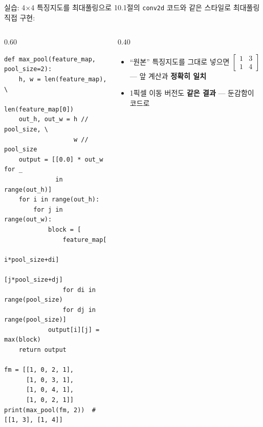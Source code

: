\begin{frame}[fragile,shrink=18]{실습: 4$\times$4 특징지도를 최대풀링으로}
  10.1절의 \texttt{conv2d} 코드와 같은 스타일로 최대풀링 직접 구현:
  \begin{columns}[T]
    \begin{column}{0.60\textwidth}
\begin{lstlisting}
def max_pool(feature_map, pool_size=2):
    h, w = len(feature_map), \
           len(feature_map[0])
    out_h, out_w = h // pool_size, \
                   w // pool_size
    output = [[0.0] * out_w for _
              in range(out_h)]
    for i in range(out_h):
        for j in range(out_w):
            block = [
                feature_map[
                    i*pool_size+di]
                    [j*pool_size+dj]
                for di in range(pool_size)
                for dj in range(pool_size)]
            output[i][j] = max(block)
    return output

fm = [[1, 0, 2, 1],
      [1, 0, 3, 1],
      [1, 0, 4, 1],
      [1, 0, 2, 1]]
print(max_pool(fm, 2))  # [[1, 3], [1, 4]]
\end{lstlisting}
    \end{column}
    \begin{column}{0.40\textwidth}
      \begin{itemize}
        \item ``원본'' 특징지도를 그대로 넣으면
          $\begin{bmatrix}1&3\\1&4\end{bmatrix}$ ---
          앞 계산과 \textbf{정확히 일치}
        \item 1픽셀 이동 버전도 \textbf{같은 결과}
          --- 둔감함이 코드로
      \end{itemize}
    \end{column}
  \end{columns}
\end{frame}
